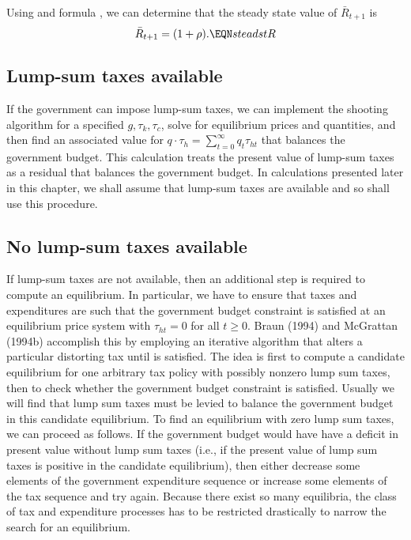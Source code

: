 Using  and formula , we can determine that the steady
state value of $\bar R_{t+1}$
is
$$ \bar R_{t+1} =  (1+\rho). \EQN steadstR $$

\subsection{Lump-sum taxes available}

If the government can  impose lump-sum taxes,  we
can implement the shooting algorithm for a specified $g, \tau_k,
 \tau_c$, solve for equilibrium prices and quantities,  and
then find an associated value for $q\cdot \tau_h =
 \sum_{t=0}^\infty q_t \tau_{ht}$   that balances the government budget.
This calculation treats
 the present value of lump-sum taxes as a residual that
balances the government budget.
In calculations presented later in this chapter,
we shall assume that lump-sum taxes are available and so shall use this
procedure.

\subsection{No lump-sum taxes available}
If lump-sum taxes are not available, then an additional step
is required to compute an equilibrium.  In particular,  we
have to ensure that taxes and expenditures are such that the
government budget constraint  is satisfied at an
equilibrium price system with $\tau_{ht} = 0 $ for all $t\geq 0$.
Braun (1994) and McGrattan (1994b) accomplish this by employing an
iterative algorithm that alters a particular distorting tax until
 is satisfied.  The idea is first to compute a candidate
equilibrium for one arbitrary tax policy with possibly nonzero lump sum taxes,  then to check whether
the government budget constraint is satisfied.  Usually we will find that lump sum taxes must be
levied to balance the government budget in this candidate equilibrium.  To find an equilibrium
with zero lump sum taxes, we can proceed as follows.  If the government
budget would have have a deficit   in present value without lump sum taxes (i.e., if the present value
of lump sum taxes is positive  in the candidate equilibrium), then either decrease some
elements of the government expenditure sequence or increase some
elements of the tax sequence and try again.  Because
there exist so many equilibria, the class of tax and expenditure
processes has to be restricted drastically  to narrow the search
for an equilibrium.




